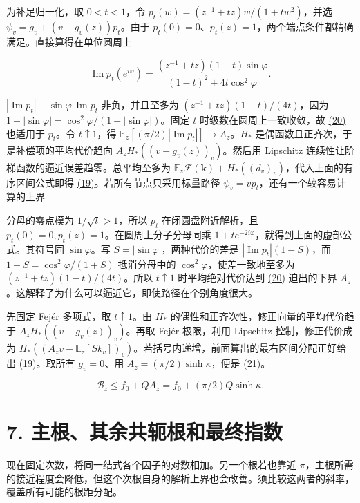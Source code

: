\documentclass[11pt,a4paper]{article}
\begin{document}
为补足归一化，取 \(0<t<1\)，令 \(p_t(w)=(z^{-1}+tz)w/(1+tw^2)\)，并选 \(\psi_v=g_v+(v-g_v(z))p_t\)。由于 \(p_t(0)=0\)、\(p_t(z)=1\)，两个端点条件都精确满足。直接算得在单位圆周上

\[
 \operatorname{Im}p_t(e^{i\varphi})
 =\frac{(z^{-1}+tz)(1-t)\sin\varphi}{(1-t)^2+4t\cos^2\varphi}.
\]

\(|\operatorname{Im}p_t|-\sin\varphi\,\operatorname{Im}p_t\) 非负，并且至多为 \((z^{-1}+tz)(1-t)/(4t)\)，因为 \(1-|\sin\varphi|=\cos^2\varphi/(1+|\sin\varphi|)\)。固定 \(t\) 时级数在圆周上一致收敛，故 \hyperref[eq:20]{(20)} 也适用于 \(p_t\)。令 \(t\uparrow1\)，得 \(\mathbb E_z[(\pi/2)|\operatorname{Im}p_t|]\to A_z\)。\(H_*\) 是偶函数且正齐次，于是补偿项的平均代价趋向 \(A_zH_*((v-g_v(z))_v)\)。然后用 Lipschitz 连续性让阶梯函数的逼近误差趋零。总平均至多为 \(\mathbb E_z\mathcal F(\mathbf k)+H_*((d_v)_v)\)，代入上面的有序区间公式即得 \hyperref[eq:19]{(19)}。若所有节点只采用标量路径 \(\psi_v=vp_t\)，还有一个较容易计算的上界

分母的零点模为 \(1/\sqrt t>1\)，所以 \(p_t\) 在闭圆盘附近解析，且 \(p_t(0)=0,p_t(z)=1\)。在圆周上分子分母同乘 \(1+te^{-2i\varphi}\)，就得到上面的虚部公式。其符号同 \(\sin\varphi\)。写 \(S=|\sin\varphi|\)，两种代价的差是 \(|\operatorname{Im}p_t|(1-S)\)，而 \(1-S=\cos^2\varphi/(1+S)\) 抵消分母中的 \(\cos^2\varphi\)，使差一致地至多为 \((z^{-1}+tz)(1-t)/(4t)\)。所以 \(t\uparrow1\) 时平均绝对代价达到 \hyperref[eq:20]{(20)} 迫出的下界 \(A_z\)。这解释了为什么可以逼近它，即使路径在个别角度很大。

先固定 Fejér 多项式，取 \(t\uparrow1\)。由 \(H_*\) 的偶性和正齐次性，修正向量的平均代价趋于 \(A_z H_*((v-g_v(z))_v)\)。再取 Fejér 极限，利用 Lipschitz 控制，修正代价成为 \(H_*((A_zv-\mathbb E_z[Sk_v])_v)\)。若括号内递增，前面算出的最右区间分配正好给出 \hyperref[eq:19]{(19)}。取所有 \(g_v=0\)、用 \(A_z=(\pi/2)\sinh\kappa\)，便是 \hyperref[eq:21]{(21)}。

\[
 \mathcal B_z\le f_0+QA_z=f_0+(\pi/2)Q\sinh\kappa.                       \tag{21}\label{eq:21}
\]

\section{7. 主根、其余共轭根和最终指数}\label{ux4e3bux6839ux5176ux4f59ux5171ux8f6dux6839ux548cux6700ux7ec8ux6307ux6570}

现在固定次数，将同一结式各个因子的对数相加。另一个根若也靠近 \(\pi\)，主根所需的接近程度会降低，但这个次根自身的解析上界也会改善。须比较这两者的斜率，覆盖所有可能的根距分配。
\end{document}
